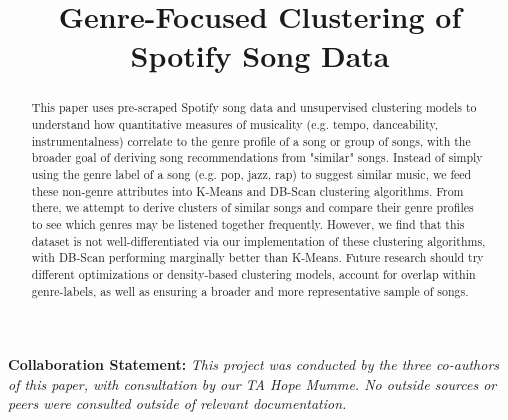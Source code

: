 \documentclass[conference]{IEEEtran}
\begin{document}
\title{Genre-Focused Clustering of Spotify Song Data}

\author{
\and
{}
\and
{}
}
\maketitle

\thispagestyle{plain}
\pagestyle{plain}

\textbf{Collaboration Statement:} \textit{This project was conducted by the three co-authors of this paper, with consultation by our TA Hope Mumme. No outside sources or peers were consulted outside of relevant documentation.}\newline{}

\begin{abstract}
 This paper uses pre-scraped Spotify song data and unsupervised clustering models to understand how quantitative measures of musicality (e.g. tempo, danceability, instrumentalness) correlate to the genre profile of a song or group of songs, with the broader goal of deriving song recommendations from "similar" songs. Instead of simply using the genre label of a song (e.g. pop, jazz, rap) to suggest similar music, we feed these non-genre attributes into K-Means and DB-Scan clustering algorithms. From there, we attempt to derive clusters of similar songs and compare their genre profiles to see which genres may be listened together frequently. However, we find that this dataset is not well-differentiated via our implementation of these clustering algorithms, with DB-Scan performing marginally better than K-Means. Future research should try different optimizations or density-based clustering models, account for overlap within genre-labels, as well as ensuring a broader and more representative sample of songs. 
 
\end{abstract}
\end{document}
